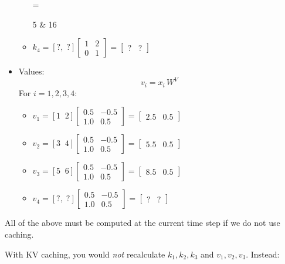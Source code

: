 \begin{itemize}
\begin{itemize}
			 = \begin{bmatrix}5 & 16\end{bmatrix}\)
		   \item \(k_4 = [?,\; ?] \begin{bmatrix}1 & 2 \\ 0 & 1\end{bmatrix} 
			 = \begin{bmatrix}? & ?\end{bmatrix}\)
	   \end{itemize}
	\item Values:
	   \[
		 v_i = x_i \, W^V
	   \]
	   For \(i=1,2,3,4\):
	   \begin{itemize}
		   \item \(v_1 = [1\;\;2] \begin{bmatrix}0.5 & -0.5 \\ 1.0 & 0.5\end{bmatrix} 
			 = \begin{bmatrix}2.5 & 0.5\end{bmatrix}\)
		   \item \(v_2 = [3\;\;4] \begin{bmatrix}0.5 & -0.5 \\ 1.0 & 0.5\end{bmatrix} 
			 = \begin{bmatrix}5.5 & 0.5\end{bmatrix}\)
		   \item \(v_3 = [5\;\;6] \begin{bmatrix}0.5 & -0.5 \\ 1.0 & 0.5\end{bmatrix} 
			 = \begin{bmatrix}8.5 & 0.5\end{bmatrix}\)
		   \item \(v_4 = [?,\; ?] \begin{bmatrix}0.5 & -0.5 \\ 1.0 & 0.5\end{bmatrix} 
			 = \begin{bmatrix}? & ?\end{bmatrix}\)
	   \end{itemize}
\end{itemize}

All of the above must be computed at the current time step if we do not use caching.

With KV caching, you would \emph{not} recalculate \(k_1, k_2, k_3\) and \(v_1, v_2, v_3\). Instead:

